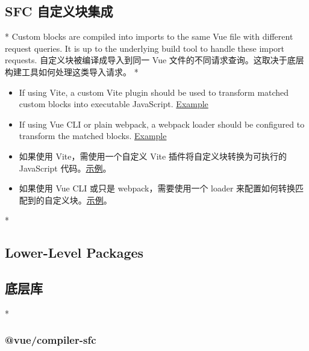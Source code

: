 \begin{paracol}{2}
\subsection{SFC 自定义块集成}
\switchcolumn[0]*%
Custom blocks are compiled into imports to the same Vue file with
different request queries. It is up to the underlying build tool to
handle these import requests.
\switchcolumn
自定义块被编译成导入到同一 Vue
文件的不同请求查询。这取决于底层构建工具如何处理这类导入请求。
\switchcolumn[0]*%
\begin{itemize}
\item
  If using Vite, a custom Vite plugin should be used to transform
  matched custom blocks into executable JavaScript.
  \href{https://github.com/vitejs/vite-plugin-vue/tree/main/packages/plugin-vue\#example-for-transforming-custom-blocks}{Example}
\item
  If using Vue CLI or plain webpack, a webpack loader should be
  configured to transform the matched blocks.
  \href{https://vue-loader.vuejs.org/guide/custom-blocks.html}{Example}
\end{itemize}
\switchcolumn
\begin{itemize}
\item
  如果使用 Vite，需使用一个自定义 Vite 插件将自定义块转换为可执行的
  JavaScript
  代码。\href{https://github.com/vitejs/vite-plugin-vue/tree/main/packages/plugin-vue\#example-for-transforming-custom-blocks}{示例}。
\item
  如果使用 Vue CLI 或只是 webpack，需要使用一个 loader
  来配置如何转换匹配到的自定义块。\href{https://vue-loader.vuejs.org/zh/guide/custom-blocks.html}{示例}。
\end{itemize}
\switchcolumn[0]*%
\subsection{Lower-Level Packages}
\switchcolumn
\subsection{底层库}
\switchcolumn[0]*%
\subsubsection{@vue/compiler-sfc}
\switchcolumn

\end{paracol}
